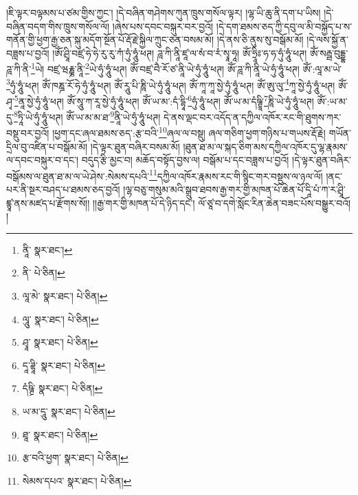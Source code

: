 །ཇི་ལྟར་བལྟམས་པ་ཙམ་གྱིས་ཀྱང་། །དེ་བཞིན་གཤེགས་ཀུན་ཁྲུས་གསོལ་ལྟར། །ལྷ་ཡི་ཆུ་ནི་དག་པ་ཡིས། །དེ་བཞིན་བདག་གིས་ཁྲུས་གསོལ་ལོ། །ཞེས་པས་དབང་བསྐུར་བར་བྱའོ། །དེ་དག་ཐམས་ཅད་ཀྱི་དབུ་ལ་མི་བསྐྱོད་པ་ས་གནོན་གྱི་ཕྱག་རྒྱ་ཅན་སྐུ་མདོག་སྔོན་པོ་རྡོ་རྗེ་སྐྱིལ་ཀྲུང་ཅན་བསམ་མོ། །དེ་ནས་ཅི་ནུས་སུ་བསྒོམ་མོ། །དེ་ལས་སྐྱོ་ན་བཟླས་པ་བྱའོ། །ཨོཾ་ཤྲཱི་བཛྲ་ཧེ་ཧེ་རུ་རུ་ཀཾ་ཧུཾ་ཧཱུཾ་ཕཊ། ཌཱ་ཀི་ནཱི་ཛཱ་ལ་སཾ་བ་རཾ་སྭཱ་ཧཱ། ཨོཾ་ཧྲཱིཿ་ཧ་ཧ་ཧུཾ་ཧཱུཾ་ཕཊ། ཨོཾ་སརྦྦ་བུདྡྷ་ཌཱ་ཀི་ནི་\footnote{ནཱི་  སྣར་ཐང་། }ཡེ། བཛྲ་ཝརྞྞ་ནཱི་\footnote{ནི་  པེ་ཅིན། }ཡེ་ཧུཾ་ཧཱུཾ་ཕཊ། ཨོཾ་བཛྲ་བཻ་རོ་ཙ་ནཱི་ཡེ་ཧུཾ་ཧཱུཾ་ཕཊ། ཨོཾ་ཌཱ་ཀི་ནཱི་ཡེ་ཧུཾ་ཧཱུཾ་ཕཊ། ཨོཾ་:ལཱ་མ་ཡེ་\footnote{ལཱ་མེ་  སྣར་ཐང་།  པེ་ཅིན། }ཧུཾ་ཧཱུཾ་ཕཊ། ཨོཾ་ཁཎྜ་རོ་ཧེ་ཧུཾ་ཧཱུཾ་ཕཊ། ཨོཾ་རཱུ་པི་ཎཱི་ཡེ་ཧུཾ་ཧཱུཾ་ཕཊ། ཨོཾ་ཀཱ་ཀཱ་སྱེ་ཧུཾ་ཧཱུཾ་ཕཊ། ཨོཾ་ཨུ་ལུ་\footnote{ལཱུ་  སྣར་ཐང་།  པེ་ཅིན། }ཀཱ་སྱེ་ཧུཾ་ཧཱུཾ་ཕཊ། ཨོཾ་ཤྭ་\footnote{ཤྭཱ་  སྣར་ཐང་།  པེ་ཅིན། }ནཱ་སྱེ་ཧུཾ་ཧཱུཾ་ཕཊ། ཨོཾ་སཱུ་ཀ་རཱ་སྱེ་ཧུཾ་ཧཱུཾ་ཕཊ། ཨོཾ་ཡ་མ་:དཾ་དྷཱི་\footnote{དཱ་ཌྷཱི་  སྣར་ཐང་།  པེ་ཅིན། }ཧུཾ་ཧཱུཾ་ཕཊ། ཨོཾ་ཡ་མ་དཾཥྚྲཱི་\footnote{དཾཥྚྲི་  སྣར་ཐང་།  པེ་ཅིན། }ཎཱི་ཡེ་ཧུཾ་ཧཱུཾ་ཕཊ། ཨོཾ་:ཡ་མ་དུ་\footnote{ཡ་མ་དཱུ་  སྣར་ཐང་།  པེ་ཅིན། }ཏཱི་ཡེ་ཧུཾ་ཧཱུཾ་ཕཊ། ཨོཾ་ཡ་མ་མ་ཐ་\footnote{ཐཱ་  སྣར་ཐང་།  པེ་ཅིན། }ནཱི་ཡེ་ཧུཾ་ཧཱུཾ་ཕཊ། དེ་ནས་ལྡང་བར་འདོད་ན་དཀྱིལ་འཁོར་རང་གི་ཐུགས་ཀར་བསྡུ་བར་བྱའོ། །ཕྱག་དང་ཞལ་ཐམས་ཅད་:རྩ་བའི་\footnote{རྩ་བའི་ཕྱག་  སྣར་ཐང་།  པེ་ཅིན། }ཞལ་ལ་བསྡུ། ཞལ་གཅིག་ཕྱག་གཉིས་པ་གཡས་རྡོ་རྗེ། གཡོན་དྲིལ་བུ་འཛིན་པ་བསྒོམ་མོ། །དེ་ལྟར་ཐུན་བཞིར་བསམ་མོ། །ཐུན་ཐ་མ་ལ་སྐད་ཅིག་མས་དཀྱིལ་འཁོར་དུ་ལྷ་རྣམས་ལ་དབང་བསྐུར་བ་དང་། བདུད་རྩི་མྱང་བ། མཆོད་བསྟོད་བྱས་ལ། བསྒོམ་པ་དང་བཟླས་པ་བྱའོ། །དེ་ལྟར་ཐུན་བཞིར་བསྒོམས་ལ་ཐུན་ཐ་མ་ལ་ཡེ་ཤེས་:སེམས་དཔའི་\footnote{སེམས་དཔའ་  སྣར་ཐང་།  པེ་ཅིན། }དཀྱིལ་འཁོར་རྣམས་རང་གི་སྙིང་གར་བསྡུས་ལ་ཉལ་ལོ། །ནང་པར་ནི་སྔར་བཤད་པ་ཐམས་ཅད་བྱའོ། །ལྷ་བཅུ་གསུམ་མའི་སྒྲུབ་ཐབས་རྒྱ་གར་གྱི་མཁན་པོ་ཆེན་པོ་དཱི་པཾ་ཀ་ར་ཤྲཱི་ཛྙཱ་ནས་མཛད་པ་རྫོགས་སོ།། །།རྒྱ་གར་གྱི་མཁན་པོ་དེ་ཉིད་དང་། ལོ་ཙཱ་བ་དགེ་སློང་རིན་ཆེན་བཟང་པོས་བསྒྱུར་བའོ། ། 